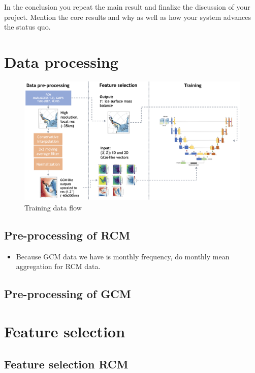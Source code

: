 \documentclass[a4paper,11pt,oneside]{report}
\begin{document}
In the conclusion you repeat the main result and finalize the discussion of
your project. Mention the core results and why as well as how your system
advances the status quo.

\cleardoublepage
{}
{}
\printbibliography

\appendix
\chapter{Data processing}
\begin{figure}[!t]
  \centering
  \includegraphics[width=\columnwidth]{images/data-flow.png}
  \caption []{\small Training data flow}
  \vspace{-3mm}
  \label{fig:training-data-flow}
\end{figure}
\section{Pre-processing of RCM}
\begin{itemize}
    \item  Because GCM data we have is monthly frequency, do monthly mean aggregation for RCM data.

\end{itemize}
\section{Pre-processing of GCM}
\chapter{Feature selection}
\section{Feature selection RCM}
\end{document}
